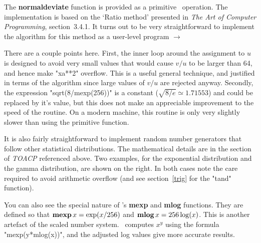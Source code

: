 \documentclass[a4paper,landscape]{article}
\def\kw#1{\begingroup\def\_{\kern.04em
    \vbox{\hrule width.3em height .6pt}\kern.08em}%
\ifmmode\mathop{\textbf{#1}}\else\hbox{\bf#1\/}\fi\endgroup}
\begin{document}
The \kw{normaldeviate} function is provided as a primitive \MP\ operation. The
implementation is based on the `Ratio method' presented in \textsl{The Art of
Computer Programming}, section~3.4.1.   It turns out to be very straightforward to
implement the algorithm for this method as a user-level program $\to$
%

There are a couple points here.  First, the inner loop around the assignment to $u$ is
designed to avoid very small values that would cause $v/u$ to be larger than 64, and
hence make "xa**2" overflow. This is a useful general technique, and justified in
terms of the algorithm since large values of $v/u$ are rejected anyway.  Secondly,
the expression "sqrt(8/mexp(256))" is a constant ($ \sqrt{8/e} \simeq 1.71553 $) and could be
replaced by it's value, but this does not make an appreciable improvement to the
speed of the routine.  On a modern machine, this routine is only very slightly
slower than using the primitive function.

It is also fairly straightforward to implement random number generators that follow other statistical
distributions.  The mathematical details are in the section of \textsl{TOACP}
referenced above. Two examples, for the exponential distribution and the gamma
distribution, are shown on the right.  In both cases note the care required to avoid
arithmetic overflow (and see section~\ref{trig} for the "tand" function). 

\medskip\noindent
You can also see the special nature of \MP's \kw{mexp} and \kw{mlog}
functions. They are defined so that $\kw{mexp} x = \exp(x/256)$ and $\kw{mlog} x =256\log(x)$.
This is another artefact of the scaled number system.  \MP\ computes $x^y$ using the
formula "mexp(y*mlog(x))", and the adjusted log values give more accurate results.
\end{document}
